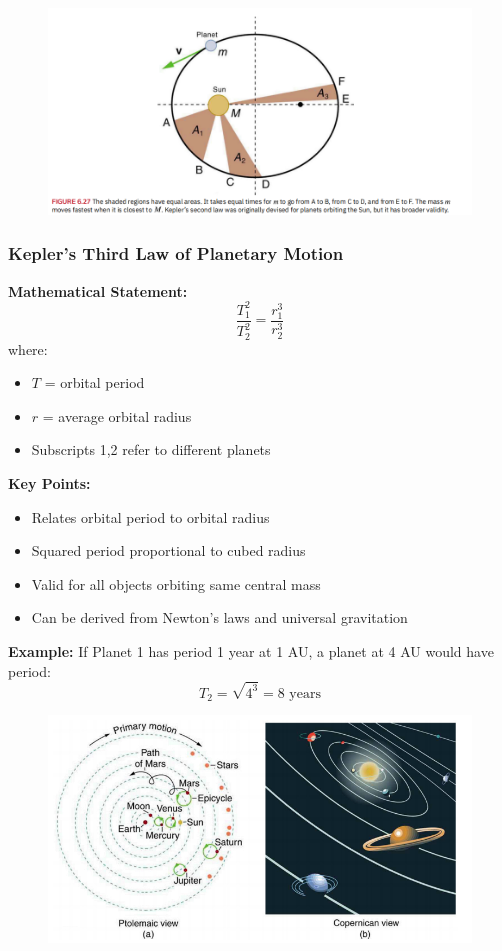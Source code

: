\documentclass{beamer}
\begin{document}
\begin{frame}
\begin{figure}
    \centering
    \includegraphics[width=1\linewidth]{Keplar.png}
\end{figure}
\end{frame}

\begin{frame}
\frametitle{Kepler's Third Law of Planetary Motion}

\textbf{Mathematical Statement:}
\[ \frac{T_1^2}{T_2^2} = \frac{r_1^3}{r_2^3} \]
where:
\begin{itemize}
    \item $T$ = orbital period
    \item $r$ = average orbital radius
    \item Subscripts 1,2 refer to different planets
\end{itemize}

\textbf{Key Points:}
\begin{itemize}
    \item Relates orbital period to orbital radius
    \item Squared period proportional to cubed radius
    \item Valid for all objects orbiting same central mass
    \item Can be derived from Newton's laws and universal gravitation
\end{itemize}

\textbf{Example:}
If Planet 1 has period 1 year at 1 AU, a planet at 4 AU would have period:
\[ T_2 = \sqrt{4^3} = 8 \text{ years} \]
\end{frame}


\begin{frame}
\begin{figure}
    \centering
    \includegraphics[width=1\linewidth]{modelviews.png}
\end{figure}
\end{frame}
\end{document}
